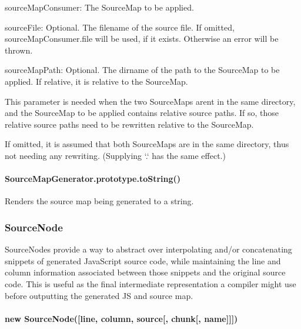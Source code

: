 \begin{DoxyItemize}
\item {\ttfamily source\+Map\+Consumer}\+: The Source\+Map to be applied.
\item {\ttfamily source\+File}\+: Optional. The filename of the source file. If omitted, source\+Map\+Consumer.\+file will be used, if it exists. Otherwise an error will be thrown.
\item {\ttfamily source\+Map\+Path}\+: Optional. The dirname of the path to the Source\+Map to be applied. If relative, it is relative to the Source\+Map.

This parameter is needed when the two Source\+Maps aren\textquotesingle{}t in the same directory, and the Source\+Map to be applied contains relative source paths. If so, those relative source paths need to be rewritten relative to the Source\+Map.

If omitted, it is assumed that both Source\+Maps are in the same directory, thus not needing any rewriting. (Supplying `\textquotesingle{}.\textquotesingle{}` has the same effect.)
\end{DoxyItemize}

\paragraph*{Source\+Map\+Generator.\+prototype.\+to\+String()}

Renders the source map being generated to a string.

\subsubsection*{Source\+Node}

Source\+Nodes provide a way to abstract over interpolating and/or concatenating snippets of generated Java\+Script source code, while maintaining the line and column information associated between those snippets and the original source code. This is useful as the final intermediate representation a compiler might use before outputting the generated J\+S and source map.

\paragraph*{new Source\+Node(\mbox{[}line, column, source\mbox{[}, chunk\mbox{[}, name\mbox{]}\mbox{]}\mbox{]})}


